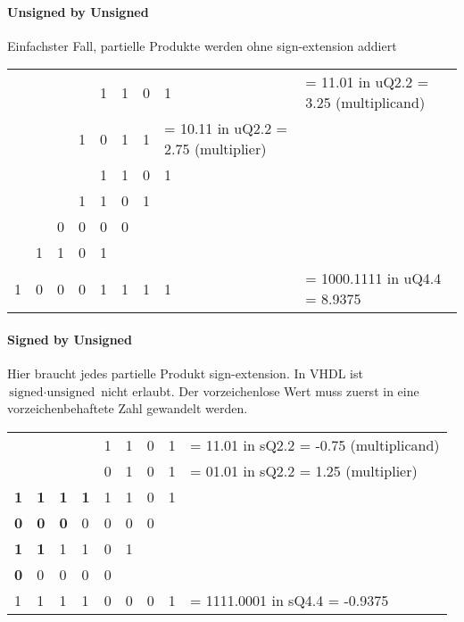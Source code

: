 \paragraph{Unsigned by Unsigned}$~$ \\
Einfachster Fall, partielle Produkte werden ohne sign-extension addiert\\
\begin{minipage}{0.7\linewidth}
  \begin{tabular}{ l l l l l l l l | l}
  & & & & 1 & 1 & 0 & 1 & = 11.01 in uQ2.2 = 3.25 (multiplicand)\\
   & & & 1 & 0 & 1 & 1 & = 10.11 in uQ2.2 = 2.75 (multiplier)\\
  \hline
  & & & & 1 & 1 & 0 & 1 & \\
  & & & 1 & 1 & 0 & 1 & & \\
  & & 0 & 0 & 0 & 0 & & & \\
  & 1 & 1 & 0 & 1 & & & & \\
  \hline
  1 & 0 & 0 & 0 & 1 & 1 & 1 & 1 & = 1000.1111 in uQ4.4 = 8.9375
  \end{tabular}
\end{minipage}


\paragraph{Signed by Unsigned}$~$ \\
Hier braucht jedes partielle Produkt sign-extension. In VHDL ist $\text{signed} \cdot \text{unsigned}$ nicht erlaubt. Der vorzeichenlose Wert muss zuerst in eine vorzeichenbehaftete Zahl gewandelt werden.\\
\begin{minipage}{0.7\linewidth}
  \begin{tabular}{ l l l l l l l l | l}
  & & & & 1 & 1 & 0 & 1 & = 11.01 in sQ2.2 = -0.75 (multiplicand)\\
  & & & & 0 & 1 & 0 & 1 & = 01.01 in sQ2.2 = 1.25 (multiplier)\\
  \hline
  \textbf{1} & \textbf{1} & \textbf{1} & \textbf{1} & 1 & 1 & 0 & 1 & \\
  \textbf{0} & \textbf{0} & \textbf{0} & 0 & 0 & 0 & 0 & & \\
  \textbf{1} & \textbf{1} & 1 & 1 & 0 & 1 & & & \\
  \textbf{0} & 0 & 0 & 0 & 0 & & & & \\
  \hline
  1 & 1 & 1 & 1 & 0 & 0 & 0 & 1 & = 1111.0001 in sQ4.4 = -0.9375
  \end{tabular}
\end{minipage}

